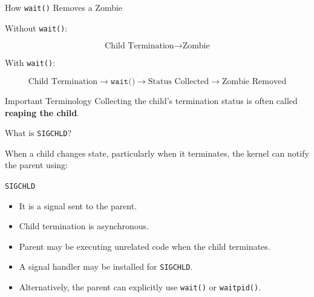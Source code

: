 \documentclass[aspectratio=169]{beamer}
\begin{document}
\begin{frame}{How \texttt{wait()} Removes a Zombie}

Without \texttt{wait()}:

\[
\text{Child Termination}
\rightarrow
\text{Zombie}
\]

With \texttt{wait()}:

\[
\text{Child Termination}
\rightarrow
\texttt{wait()}
\rightarrow
\text{Status Collected}
\rightarrow
\text{Zombie Removed}
\]

\begin{block}{Important Terminology}
Collecting the child's termination status is often called
\textbf{reaping the child}.
\end{block}

\end{frame}

\begin{frame}{What is \texttt{SIGCHLD}?}

When a child changes state, particularly when it terminates, the kernel can
notify the parent using:

\begin{center}
\Large
\texttt{SIGCHLD}
\end{center}

\begin{itemize}

    \item It is a signal sent to the parent.

    \item Child termination is asynchronous.

    \item Parent may be executing unrelated code when the child terminates.

    \item A signal handler may be installed for \texttt{SIGCHLD}.

    \item Alternatively, the parent can explicitly use
    \texttt{wait()} or \texttt{waitpid()}.

\end{itemize}

\end{frame}
\end{document}
